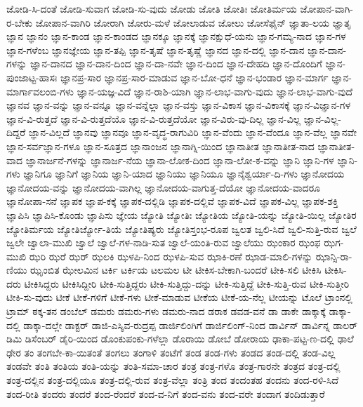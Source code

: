 {ಜೋಡಿ-ಸಿ-ದಂತೆ
ಜೋಡಿ-ಸುವಾಗ
ಜೋಡಿ-ಸು-ವುದು
ಜೋಡು
ಜೋತಿ
ಜೋತಿಃ
ಜೋತಿರ್ಮಯ
ಜೋಪಾನ-ವಾಗಿ-ರ-ಬೇಕು
ಜೋಪಾನ-ವಾಗಿರಿ
ಜೋರಾಗಿ
ಜೋರು-ಮಳೆ
ಜೋಲಾಡುವ
ಜೋಲು
ಜೋಸೆಫೈನ್
ಜ್ಞಾತಾ-ಲಯ
ಜ್ಞಾತೃ
ಜ್ಞಾನ
ಜ್ಞಾನಂ
ಜ್ಞಾನ-ಕಾಂಡ
ಜ್ಞಾನ-ಕಾಂಡದ
ಜ್ಞಾನಕ್ಕೂ
ಜ್ಞಾನಕ್ಕೆ
ಜ್ಞಾನಕ್ಷುಧೆ-ಯನು
ಜ್ಞಾನ-ಗಮ್ಯ-ನಾದ
ಜ್ಞಾನ-ಗಳ
ಜ್ಞಾನ-ಗಳೆಂಬ
ಜ್ಞಾನಜ್ಞೇಯ
ಜ್ಞಾನ-ತಪ್ಪಿ
ಜ್ಞಾನ-ತೃಷೆ
ಜ್ಞಾನ-ತೃಷ್ಣೆ
ಜ್ಞಾನದ
ಜ್ಞಾನ-ದಲ್ಲಿ
ಜ್ಞಾನ-ದಾನ
ಜ್ಞಾನ-ದಾನ-ಗಳನ್ನು
ಜ್ಞಾನ-ದಾನದ
ಜ್ಞಾನ-ದಾನ-ದಿಂದ
ಜ್ಞಾನ-ದಾ-ನವೇ
ಜ್ಞಾನ-ದಿಂದ
ಜ್ಞಾನ-ದೇಹದಿ
ಜ್ಞಾನ-ದೊಂದಿಗೆ
ಜ್ಞಾನ-ಪುಂಜಾಟ್ಟ-ಹಾಸಃ
ಜ್ಞಾನಪ್ರ-ಸಾರ
ಜ್ಞಾನಪ್ರ-ಸಾರ-ಮಾಡುವ
ಜ್ಞಾನ-ಬೋ-ಧನೆ
ಜ್ಞಾನ-ಭಂಡಾರ
ಜ್ಞಾನ-ಮಾರ್ಗ
ಜ್ಞಾನ-ಮಾರ್ಗಾವಲಂಬಿ-ಗಳು
ಜ್ಞಾನ-ಯಜ್ಞ-ವಿದೆ
ಜ್ಞಾನ-ರಾಶಿ-ಯಾಗಿ
ಜ್ಞಾನ-ಲಾಭ-ವಾಗು-ವುದು
ಜ್ಞಾನ-ಲಾಭ-ವಾಗು-ವುದೆ
ಜ್ಞಾನವ
ಜ್ಞಾನ-ವನ್ನು
ಜ್ಞಾನ-ವನ್ನೂ
ಜ್ಞಾನ-ವನ್ನೆಲ್ಲಾ
ಜ್ಞಾನ-ವಸ್ತು
ಜ್ಞಾನ-ವಿಕಾಸ
ಜ್ಞಾನ-ವಿಕಾಸಕ್ಕೆ
ಜ್ಞಾನ-ವಿಜ್ಞಾನ-ಗಳ
ಜ್ಞಾನ-ವಿ-ರುತ್ತದೆ
ಜ್ಞಾನ-ವಿ-ರುತ್ತದೆಯೊ
ಜ್ಞಾನ-ವಿ-ರುತ್ತದೆಯೋ
ಜ್ಞಾನ-ವಿರು-ವು-ದಿಲ್ಲ
ಜ್ಞಾನ-ವಿಲ್ಲ
ಜ್ಞಾನ-ವಿಲ್ಲ-ದಿದ್ದರೆ
ಜ್ಞಾನ-ವಿಲ್ಲದೆ
ಜ್ಞಾನವು
ಜ್ಞಾನವೂ
ಜ್ಞಾನ-ವೃದ್ಧ-ರಾಗುವಿರಿ
ಜ್ಞಾನ-ವೆಂದು
ಜ್ಞಾನ-ವೆಂದೂ
ಜ್ಞಾನ-ವೆಲ್ಲ
ಜ್ಞಾನವೇ
ಜ್ಞಾನ-ಸರ್ವಜ್ಞಾನ-ಗಳೂ
ಜ್ಞಾನ-ಸೂತ್ರದ
ಜ್ಞಾನಾಂಜನ
ಜ್ಞಾನಾಗ್ನಿ-ಯಿಂದ
ಜ್ಞಾನಾತೀತ
ಜ್ಞಾನಾತೀತ-ನಾದ
ಜ್ಞಾನಾತೀತ-ವಾದ
ಜ್ಞಾನಾರ್ಜನೆ-ಗಳನ್ನು
ಜ್ಞಾನಾರ್ಜ-ನೆಯ
ಜ್ಞಾನಾ-ಲೋಕ-ದಿಂದ
ಜ್ಞಾನಾ-ಲೋ-ಕ-ವನ್ನು
ಜ್ಞಾನಿ
ಜ್ಞಾನಿ-ಗಳ
ಜ್ಞಾನಿ-ಗಳು
ಜ್ಞಾನಿಗೂ
ಜ್ಞಾನಿಗೆ
ಜ್ಞಾನಿಯ
ಜ್ಞಾನಿ-ಯಾದ
ಜ್ಞಾನಿಯು
ಜ್ಞಾನಿಯೂ
ಜ್ಞಾನೈಶ್ವರ್ಯಾ-ದಿ-ಗಳು
ಜ್ಞಾನೋದಯ
ಜ್ಞಾನೋದಯ-ವನ್ನು
ಜ್ಞಾನೋದಯ-ವಾಗಿಲ್ಲ
ಜ್ಞಾನೋದಯ-ವಾಗುತ್ತ-ದೆಯೋ
ಜ್ಞಾನೋದಯ-ವಾದರೂ
ಜ್ಞಾನೋಪಾ-ಸನೆ
ಜ್ಞಾಪಕ
ಜ್ಞಾಪ-ಕಕ್ಕೆ
ಜ್ಞಾಪಕ-ದಲ್ಲಿಡಿ
ಜ್ಞಾಪಕ-ದಲ್ಲಿವೆ
ಜ್ಞಾಪಕ-ವಿದೆ
ಜ್ಞಾಪಕ-ವಿಲ್ಲ
ಜ್ಞಾಪಕ-ಶಕ್ತಿ
ಜ್ಞಾಪಿಸಿ
ಜ್ಞಾಪಿಸಿ-ಕೊಂಡು
ಜ್ಞಾಪಿಸು
ಜ್ಞೇಯ
ಜ್ಯೋತಿ
ಜ್ಯೋತಿಃ
ಜ್ಯೋತಿಯ
ಜ್ಯೋತಿ-ಯನ್ನು
ಜ್ಯೋತಿ-ಯಿಲ್ಲ
ಜ್ಯೋತಿರ
ಜ್ಯೋತಿರ್ಮಯ
ಜ್ಯೋತಿರ್ಜ್ಯೋ-ತಿಯೆ
ಜ್ಯೋತಿಷ್ಯರು
ಜ್ಯೋತಿಸ್ತಂಭ-ರೂಪ
ಜ್ವಲತ
ಜ್ವಲಿ-ಸಿದೆ
ಜ್ವಲಿ-ಸುತ್ತಿ-ರುವ
ಜ್ವಲೆ
ಜ್ವಲೇ
ಜ್ವಾಲಾ-ಮುಖಿ
ಜ್ವಾಲೆ
ಜ್ವಾಲೆ-ಗಳ-ನಾಡಿ-ಸುತ
ಜ್ವಾಲೆ-ಯಂತಿ-ರುವ
ಜ್ವಾಲೆಯು
ಝಂಕಾರ
ಝಂಫ
ಝಗ-ಮುಖಿ
ಝರಿ
ಝರೆ
ಝರ್
ಝಲಕಿ
ಝಳಪಿ-ನಿಂದ
ಝಳಪಿ-ಸುವ
ಝಾಕಿ-ರಣೆ
ಝಾಡ-ಮಾಲಿ-ಗಳನ್ನು
ಝಾನ್ಸಿ-ರಾ-ಣಿಯು
ಝೃಂಬಿತ
ಝೇಲಮಿನ
ಟರ್ಕಿ
ಟರ್ಕಿಯ
ಟಲಮಲ
ಟೀ
ಟೀಕಿಸ-ಬೇಕಾಗಿ-ಬಂದರೆ
ಟೀಕಿ-ಸಲಿ
ಟೀಕಿಸಿ
ಟೀಕಿಸಿ-ದರು
ಟೀಕಿಸಿದ್ದರು
ಟೀಕಿಸಿದ್ದೀರಿ
ಟೀಕಿ-ಸುತ್ತಿದ್ದರು
ಟೀಕಿ-ಸುತ್ತಿದ್ದು-ದನ್ನು
ಟೀಕಿ-ಸುತ್ತಿದ್ದೆ
ಟೀಕಿ-ಸುತ್ತಿ-ರುವ
ಟೀಕಿ-ಸುತ್ತೀರಿ
ಟೀಕಿ-ಸು-ವುದು
ಟೀಕೆ
ಟೀಕೆ-ಗಳಿಗೆ
ಟೀಕೆ-ಗಳು
ಟೀಕೆ-ಮಾಡುವ
ಟೀಕೆಯ
ಟೀಕೆ-ಯ-ನೆಲ್ಲ
ಟೀಯನ್ನು
ಟೊಲೆ
ಟ್ರಾಂನಲ್ಲಿ
ಟ್ರಾಮ್
ಠಕ್ಕ-ತನ
ಡಂಬೆಲ್
ಡಮರು
ಡಮರು-ಗಳು
ಡಮರು-ನಾದ
ಡರಾಕ
ಡವಡ-ವನೆ
ಡಾ
ಡಾಕೇ
ಡಾಕ್ಕಾಕ್ಕೆ
ಡಾಕ್ಕಾ-ದಲ್ಲಿ
ಡಾಕ್ಕಾ-ದಲ್ಲೇ
ಡಾಕ್ಟರ್
ಡಾಜಿ-ಎಸ್ಶಿವ-ರುದ್ರಪ್ಪ
ಡಾರ್ಜಿಲಿಂಗಿಗೆ
ಡಾರ್ಜಿಲಿಂಗ್-ನಿಂದ
ಡಾರ್ವಿನ್
ಡಾರ್ವಿನ್ನ
ಡಾಲರ್
ಡಿಮಿ
ಡಿಸೆಂಬರ್
ಡೈರಿ-ಯಿಂದ
ಡೊಂಕುಪಂಕು-ಗಳೆಲ್ಲಾ
ಡೊರಾಯಿ
ಡೋಬೆ
ಡೋರಾಯ
ಢಾಕಾ-ಪಟ್ಟ-ಣ-ದಲ್ಲಿ
ಢಾಲೆ
ಢೇರ
ತಂ
ತಂಗಬೇ-ಕಾ-ಯಿತಂತೆ
ತಂಗಲು
ತಂಗಾಳಿ
ತಂಟೆಗೆ
ತಂಡ
ತಂಡ-ಗಳು
ತಂಡದ
ತಂಡ-ದಲ್ಲಿ
ತಂಡ-ವಿಲ್ಲ
ತಂಡವೇ
ತಂತಿ
ತಂತಿಯ
ತಂತಿ-ಯನ್ನು
ತಂತಿ-ಸಮಾ-ಚಾರ
ತಂತ್ರ
ತಂತ್ರ-ಗಳೊ
ತಂತ್ರ-ಗಾರನೇ
ತಂತ್ರದ
ತಂತ್ರ-ದಲ್ಲಿ
ತಂತ್ರ-ದಲ್ಲಿನ
ತಂತ್ರ-ದಲ್ಲಿಯೂ
ತಂತ್ರ-ದಲ್ಲಿ-ರುವ
ತಂತ್ರ-ವೆಲ್ಲಾ
ತಂತ್ರಿ
ತಂದ
ತಂದಂತಹ
ತಂದನು
ತಂದ-ರಳಿ-ಸಿದೆ
ತಂದ-ರೀತಿ
ತಂದರು
ತಂದರೆ
ತಂದ-ರೆಂದರೆ
ತಂದ-ವ-ನಿಗೆ
ತಂದ-ವನು
ತಂದ-ವರೇ
ತಂದಾಗ
ತಂದಿಡುತ್ತಾರೆ
}
